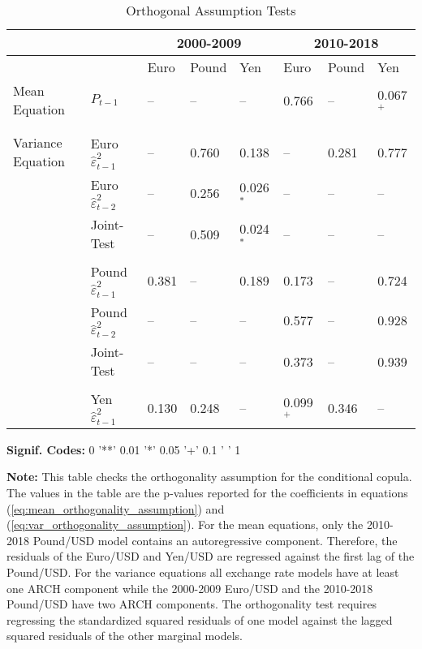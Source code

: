 \documentclass[12pt]{article}
\begin{document}
\begin{table}
	\fontsize{10pt}{10pt}\selectfont
	\centering
	\caption{Orthogonal Assumption Tests}
	\begin{tabular}{l l | l l l | l l l}
		\midrule
				& & \multicolumn{3}{c}{2000-2009} & \multicolumn{3}{c}{2010-2018} \\
		\midrule
				& & Euro & Pound & Yen & Euro & Pound & Yen \\
		\hline
        Mean Equation     & $P_{t-1}$                            & --    & --    & --          &  0.766       & --      & 0.067$^{+}$  \\ \\ \\
		Variance Equation & Euro $\hat{\varepsilon}^{2}_{t-1}$   & --    & 0.760 & 0.138       &  --          & 0.281   & 0.777        \\
                          & Euro $\hat{\varepsilon}^{2}_{t-2}$   & --    & 0.256 & 0.026$^{*}$ &  --          & --      & --           \\
						  & Joint-Test                           & --    & 0.509 & 0.024$^{*}$ &  --          & --      & --           \\ \\
		                  & Pound $\hat{\varepsilon}^{2}_{t-1}$  & 0.381 & --    & 0.189       &  0.173       & --      & 0.724        \\
		                  & Pound $\hat{\varepsilon}^{2}_{t-2}$  & --    & --    & --          &  0.577       & --      & 0.928        \\
						  & Joint-Test                           & --    & --    & --          &  0.373       & --      & 0.939        \\ \\
                          & Yen $\hat{\varepsilon}^{2}_{t-1}$    & 0.130 & 0.248 & --          &  0.099$^{+}$ & 0.346   & --           \\
	\hline
	\end{tabular}
	\begin{tablenotes}
		\item{\footnotesize \textbf{Signif. Codes:} 0 '**' 0.01 '*' 0.05 '+' 0.1 ' ' 1}
		\item{\footnotesize \textbf{Note:} This table checks the orthogonality assumption for the conditional copula. The values in the table are the p-values reported for the coefficients in equations (\ref{eq:mean_orthogonality_assumption}) and (\ref{eq:var_orthogonality_assumption}). For the mean equations, only the 2010-2018 Pound/USD model contains an autoregressive component. Therefore, the residuals of the Euro/USD and Yen/USD are regressed against the first lag of the Pound/USD. For the variance equations all exchange rate models have at least one ARCH component while the 2000-2009 Euro/USD and the 2010-2018 Pound/USD have two ARCH components. The orthogonality test requires regressing the standardized squared residuals of one model against the lagged squared residuals of the other marginal models.}

\end{tablenotes}
\end{table}
\end{document}
